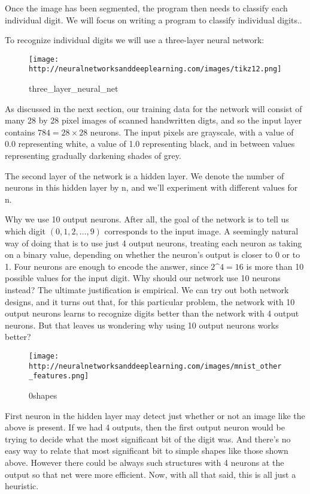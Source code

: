 \documentclass[]{article}
\begin{document}
Once the image has been segmented, the program then needs to classify
each individual digit. We will focus on writing a program to classify
individual digits..

To recognize individual digits we will use a three-layer neural network:

\begin{figure}[htbp]
\centering
\texttt{[image: http://neuralnetworksanddeeplearning.com/images/tikz12.png]}
\caption{three\_layer\_neural\_net}
\end{figure}

As discussed in the next section, our training data for the network will
consist of many 28 by 28 pixel images of scanned handwritten digts, and
so the input layer contains $ 784 = 28 \times 28 $ neurons. The input
pixels are grayscale, with a value of 0.0 representing white, a value of
1.0 representing black, and in between values representing gradually
darkening shades of grey.

The second layer of the network is a hidden layer. We denote the number
of neurons in this hidden layer by n, and we'll experiment with
different values for n.

Why we use 10 output neurons. After all, the goal of the network is to
tell us which digit $ (0, 1, 2, \ldots{}, 9) $ corresponds to the
input image. A seemingly natural way of doing that is to use just 4
output neurons, treating each neuron as taking on a binary value,
depending on whether the neuron's output is closer to 0 or to 1. Four
neurons are enough to encode the answer, since $ 2 \^{} 4 = 16 $ is
more than 10 possible values for the input digit. Why should our network
use 10 neurons instead? The ultimate justification is empirical. We can
try out both network designs, and it turns out that, for this particular
problem, the network with 10 output neurons learns to recognize digits
better than the network with 4 output neurons. But that leaves us
wondering why using 10 output neurons works better?

\begin{figure}[htbp]
\centering
\texttt{[image: http://neuralnetworksanddeeplearning.com/images/mnist\_other\_features.png]}
\caption{0shapes}
\end{figure}

First neuron in the hidden layer may detect just whether or not an image
like the above is present. If we had 4 outputs, then the first output
neuron would be trying to decide what the most significant bit of the
digit was. And there's no easy way to relate that most significant bit
to simple shapes like those shown above. However there could be always
such structures with 4 neurons at the output so that net were more
efficient. Now, with all that said, this is all just a heuristic.
\end{document}

